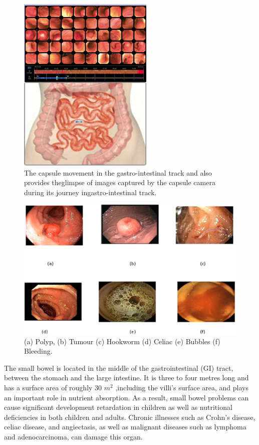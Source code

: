 \begin{figure}[h]
    \centering
    \includegraphics[totalheight=2.5in]{Chapter1/Fig4.png}
    \caption[The capsule movement in the gastro-intestinal track and also provides theglimpse of images captured by the capsule camera during its journey ingastrointestinal track]{The capsule movement in the gastro-intestinal track and also provides theglimpse of images captured by the capsule camera during its journey ingastro-intestinal track.\cite{Capsule}}
    \label{fig:label1.1}
\end{figure}

\begin{figure}[h]
    \centering
    \includegraphics[totalheight=2.0in]{Chapter1/Fig5.png}
    \caption[(a) Polyp, (b) Tumour (c) Hookworm (d) Celiac (e) Bubbles (f) Bleeding]{(a) Polyp, (b) Tumour (c) Hookworm (d) Celiac (e) Bubbles (f) Bleeding. \cite{Capsule}}
    \label{fig:label1.2}
\end{figure}
The small bowel is located in the middle of the gastrointestinal (GI) tract, between the stomach and the large intestine. It is three to four metres long and has a surface area of roughly 30 \(m^2\) ,including the villi's surface area, and plays an important role in nutrient absorption. As a result, small bowel problems can cause significant development retardation in children as well as nutritional deficiencies in both children and adults. Chronic illnesses such as Crohn's disease, celiac disease, and angiectasis, as well as malignant diseases such as lymphoma and adenocarcinoma, can damage this organ.

